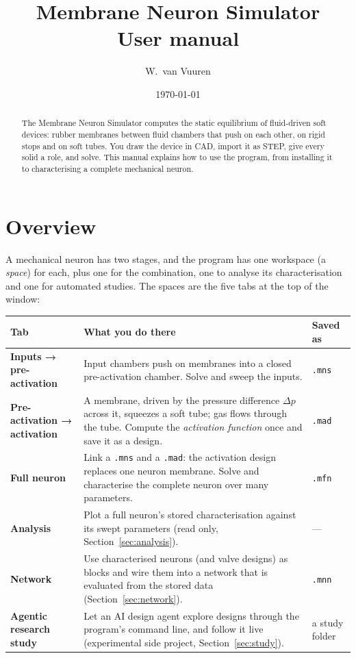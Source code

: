 \documentclass[11pt,a4paper]{article}
\title{Membrane Neuron Simulator\\[0.3em]\large User manual}
\author{W.\ van Vuuren}
\date{\today}
\newcommand{\code}[1]{\texttt{#1}}
\newcommand{\menu}[1]{\textsf{\textbf{#1}}}
\begin{document}
\maketitle

\begin{abstract}
\noindent The Membrane Neuron Simulator computes the static equilibrium of fluid-driven soft devices: rubber
membranes between fluid chambers that push on each other, on rigid stops and on soft tubes. You draw the device
in CAD, import it as STEP, give every solid a role, and solve. This manual explains how to use the program, from
installing it to characterising a complete mechanical neuron.
\end{abstract}

\tableofcontents
\newpage

\section{Overview}

A mechanical neuron has two stages, and the program has one workspace (a \emph{space}) for each, plus one for
the combination, one to analyse its characterisation and one for automated studies. The spaces are the five tabs
at the top of the window:

\begin{center}
\begin{tabularx}{\textwidth}{@{}lX l@{}}
\toprule
Tab & What you do there & Saved as \\
\midrule
\menu{Inputs → pre-activation} & Input chambers push on membranes into a closed pre-activation chamber. Solve
  and sweep the inputs. & \code{.mns} \\
\menu{Pre-activation → activation} & A membrane, driven by the pressure difference $\Delta p$ across it, squeezes a
  soft tube; gas flows through the tube. Compute the \emph{activation function} once and save it as a design. &
  \code{.mad} \\
\menu{Full neuron} & Link a \code{.mns} and a \code{.mad}: the activation design replaces one neuron membrane.
  Solve and characterise the complete neuron over many parameters. & \code{.mfn} \\
\menu{Analysis} & Plot a full neuron's stored characterisation against its swept parameters (read only,
  Section~\ref{sec:analysis}). & --- \\
\menu{Network} & Use characterised neurons (and valve designs) as blocks and wire them into a network that is
  evaluated from the stored data (Section~\ref{sec:network}). & \code{.mnn} \\
\menu{Agentic research study} & Let an AI design agent explore designs through the program's command line, and follow it
  live (experimental side project, Section~\ref{sec:study}). & a study folder \\
\bottomrule
\end{tabularx}
\end{center}
\end{document}
